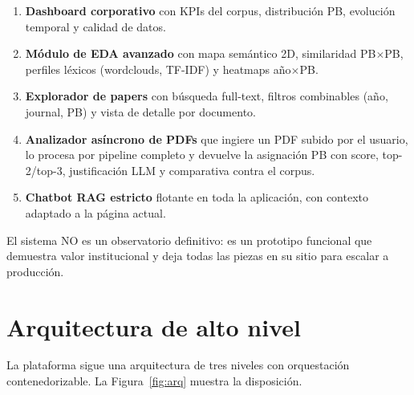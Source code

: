 \documentclass[11pt,a4paper]{article}
\begin{document}
\begin{enumerate}
\item \textbf{Dashboard corporativo} con KPIs del corpus, distribución PB, evolución temporal y calidad de datos.
\item \textbf{Módulo de EDA avanzado} con mapa semántico 2D, similaridad PB$\times$PB, perfiles léxicos (wordclouds, TF-IDF) y heatmaps año$\times$PB.
\item \textbf{Explorador de papers} con búsqueda full-text, filtros combinables (año, journal, PB) y vista de detalle por documento.
\item \textbf{Analizador asíncrono de PDFs} que ingiere un PDF subido por el usuario, lo procesa por pipeline completo y devuelve la asignación PB con score, top-2/top-3, justificación LLM y comparativa contra el corpus.
\item \textbf{Chatbot RAG estricto} flotante en toda la aplicación, con contexto adaptado a la página actual.
\end{enumerate}

El sistema NO es un observatorio definitivo: es un prototipo funcional que demuestra valor institucional y deja todas las piezas en su sitio para escalar a producción.

\section{Arquitectura de alto nivel}

La plataforma sigue una arquitectura de tres niveles con orquestación contenedorizable. La Figura~\ref{fig:arq} muestra la disposición.
\end{document}
